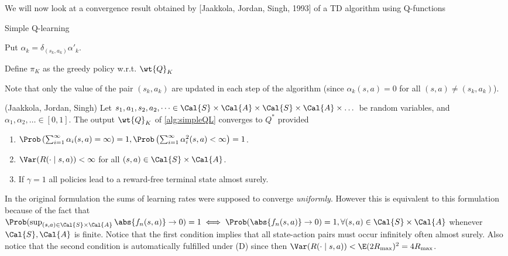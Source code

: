We will now look at a convergence result obtained by
[Jaakkola, Jordan, Singh, 1993] of a TD algorithm using Q-functions

\begin{algorithm}[H] %
  \caption{Simple Q-learning}
  Put $\alpha_k = \delta_{(s_k, a_k)} \alpha'_k$.

  Define $\pi_K$ as the greedy policy w.r.t. $\wt{Q}_K$ \\
  \label{alg:simpleQL}
\end{algorithm}
Note that only the value of the pair $(s_k, a_k)$ are updated in each
step of the algorithm
(since $\alpha_k(s, a) = 0$ for all $(s,a)\neq(s_k, a_k)$).

\begin{thm}(Jaakkola, Jordan, Singh)
  Let $s_1, a_1, s_2, a_2, \dots \in
  \Cal{S} \times \Cal{A} \times \Cal{S} \times \Cal{A} \times \dots$
  be random variables, and $\alpha_1, \alpha_2, \dots \in [0,1]$.
  The output $\wt{Q}_K$ of \cref{alg:simpleQL} converges to $Q^*$
  provided
  \begin{enumerate}
    \item $\Prob\left(\sum_{i=1}^\infty \alpha_i(s,a) = \infty\right) = 1,
      \Prob\left(\sum_{i=1}^\infty \alpha_i^2(s,a) < \infty\right) = 1$.
    \item $\Var(R(\cdot \mid s, a)) < \infty$ for all $(s, a) \in
      \Cal{S}\times\Cal{A}$.
    \item If $\gamma = 1$ all policies lead to a reward-free terminal
      state almost surely.
  \end{enumerate}
\end{thm}
In the original formulation the sums of learning rates were supposed to
converge \emph{uniformly}. However this is equivalent to this formulation
because of the fact that
$\Prob(\sup_{(s, a) \in \Cal{S} \times \Cal{A}} \abs{f_n(s, a)} \to 0) = 1 \iff
\Prob(\abs{f_n(s, a)} \to 0) = 1, \forall (s, a) \in \Cal{S} \times \Cal{A}$
whenever $\Cal{S}, \Cal{A}$ is finite.
Notice that the first condition implies that all state-action pairs
must occur infinitely often almost surely.
Also notice that the second condition is automatically fulfilled under
(D) since then $\Var(R(\cdot \mid s, a)) < \E (2R_{\max})^2 = 4 R_{\max}$.

